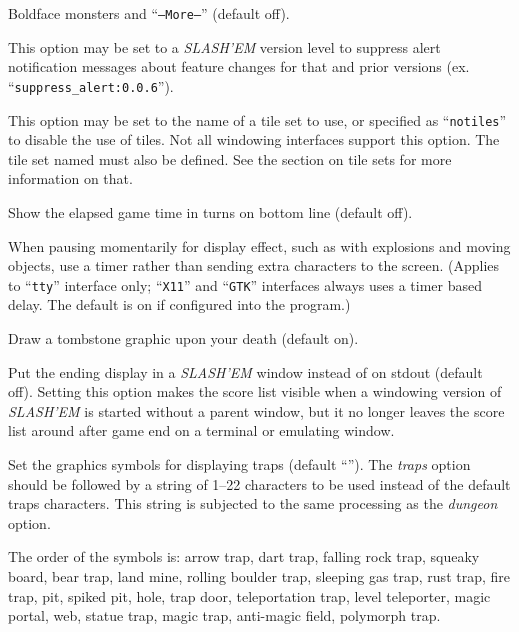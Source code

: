 \item[\ib{standout}]
Boldface monsters and ``{\tt --More--}'' (default off).

\item[\ib{suppress\_alert}]
This option may be set to a {\it SLASH'EM\/} version level to suppress
alert notification messages about feature changes for that 
and prior versions (ex. ``{\tt suppress\_alert:0.0.6}'').

\item[\ib{tiles}]
This option may be set to the name of a tile set to use, or specified
as ``{\tt notiles}'' to disable the use of tiles. Not all windowing interfaces
support this option. The tile set named must also be defined. See the
section on tile sets for more information on that.

\item[\ib{time}]
Show the elapsed game time in turns on bottom line (default off).

\item[\ib{timed\_delay}]
When pausing momentarily for display effect, such as with explosions and
moving objects, use a timer rather than sending extra characters to the
screen.  (Applies to ``{\tt tty}'' interface only; ``{\tt X11}'' and ``{\tt GTK}'' interfaces always
uses a timer based delay.  The default is on if configured into the
program.)

\item[\ib{tombstone}]
Draw a tombstone graphic upon your death (default on).

\item[\ib{toptenwin}]
Put the ending display in a {\it SLASH'EM\/} window instead of on stdout (default off).
Setting this option makes the score list visible when a windowing version
of {\it SLASH'EM\/} is started without a parent window, but it no longer leaves
the score list around after game end on a terminal or emulating window.

\item[\ib{traps}]
Set the graphics symbols for displaying traps
(default \relax{}``'').
The
{\it traps\/} 
option should be followed by a string of 1--22
characters to be used instead of the default traps characters.
This string is subjected to the same processing as the
{\it dungeon\/} 
option.

The order of the symbols is: 
arrow trap, dart trap, falling rock trap, squeaky board, bear trap,
land mine, rolling boulder trap, sleeping gas trap, rust trap, fire trap,
pit, spiked pit, hole, trap door, teleportation trap, level teleporter,
magic portal, web, statue trap, magic trap, anti-magic field, polymorph trap.

